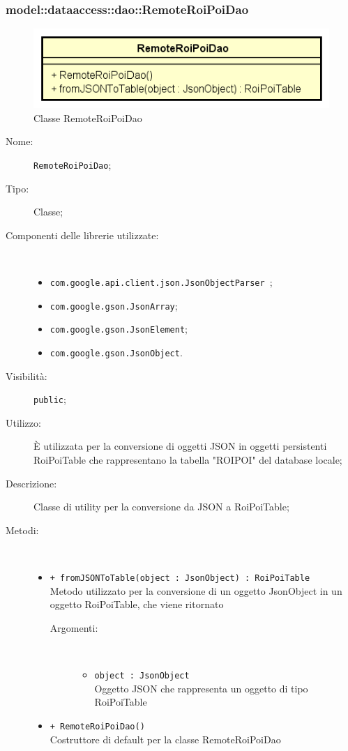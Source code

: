 \documentclass[../DefinizioneDiProdotto.tex]{subfiles}
\begin{document}
\subsubsection{model::dataaccess::dao::RemoteRoiPoiDao}

    \begin{figure}[H]
        \centering
        \includegraphics{img/RemoteRoiPoiDao.png}
        \caption{Classe RemoteRoiPoiDao}\label{fig:model::dataaccess::dao::RemoteRoiPoiDao} 
    \end{figure}
    \begin{description}
\item[Nome:] \texttt{RemoteRoiPoiDao};
\item[Tipo:] Classe;
\item[Componenti delle librerie utilizzate:] \
\begin{itemize}
\item \texttt{com.google.api.client.json.JsonObjectParser
};

\item \texttt{com.google.gson.JsonArray};

\item \texttt{com.google.gson.JsonElement};

\item \texttt{com.google.gson.JsonObject}.

\end{itemize}
\item[Visibilità:] \texttt{public};
\item[Utilizzo:] È utilizzata per la conversione di oggetti JSON in oggetti persistenti RoiPoiTable che rappresentano la tabella "ROIPOI" del database locale;
\item[Descrizione:] Classe di utility per la conversione da JSON a RoiPoiTable;
\item[Metodi:] \
\begin{itemize}
\item \texttt{+ fromJSONToTable(object : JsonObject) : RoiPoiTable}\\
Metodo utilizzato per la conversione di un oggetto JsonObject in un oggetto RoiPoiTable, che viene ritornato
 \begin{description}
\item[Argomenti:] \
\begin{itemize}
\item \texttt{object : JsonObject}\\
Oggetto JSON che rappresenta un oggetto di tipo RoiPoiTable\end{itemize}
\end{description}
\item \texttt{+ RemoteRoiPoiDao()}\\
Costruttore di default per la classe RemoteRoiPoiDao
 \end{itemize}
\end{description}
\end{document}
